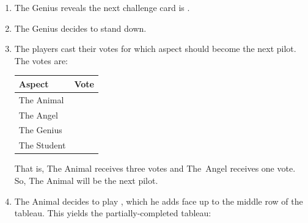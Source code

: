 \documentclass[a4paper, 10pt,notumble]{leaflet}
\DeclareRobustCommand\spades[1][black]{\textcolor{#1}{\cardfont{\}}}}
\DeclareRobustCommand\hearts[1][red]{\textcolor{#1}{{\cardfont{\{}}}}
\DeclareRobustCommand\diamonds[1][red]{\textcolor{#1}{{\cardfont{[}}}}
\DeclareRobustCommand\clubs[1][black]{\textcolor{#1}{\cardfont{]}}}
\DeclareRobustCommand\four[1][black]{\textcolor{#1}{\cardfont{4}}}
\DeclareRobustCommand\five[1][black]{\textcolor{#1}{\cardfont{5}}}
\DeclareRobustCommand\jack[1][black]{\textcolor{#1}{\cardfont{J}}}
\DeclareRobustCommand\queen[1][black]{\textcolor{#1}{\cardfont{Q}}}
\begin{document}
\begin{enumerate}
	\item The Genius reveals the next challenge card is \four[red]\hearts.
	\item The Genius decides to stand down.
	\item The players cast their votes for which aspect should become the next pilot. The votes are:
	\begin{table}[h]
	\centering
	\begin{tabular}{l r}
	\toprule
	Aspect & Vote \\ \midrule
	The Animal & \jack\clubs \\
	The Angel  & \queen[red]\hearts \\
	The Genius & \jack\spades \\
	The Student & \jack[red]\diamonds \\ \bottomrule
	\end{tabular}
	\end{table}
%	
%
	
	That is, The Animal receives three votes and The~Angel receives one vote. So, The Animal will be the next pilot.
	\item The Animal decides to play \five\clubs, which he adds face up to the middle row of the tableau. This yields the partially-completed tableau:
	

\end{enumerate}
\end{document}
